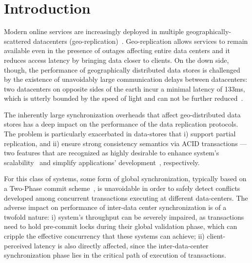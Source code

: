 \section{Introduction}
\label{sec:introduction}


Modern online services are increasingly deployed in multiple geographically-scattered datacenters (geo-replication)~\cite{spanner, kraska2013mdcc, li2012making}. Geo-replication allows services to remain available even in the presence of outages affecting entire data centers  and it reduces access latency by bringing data closer to clients. On the down side, though, the performance of geographically distributed data stores is challenged by the existence of unavoidably large communication delays between datacenters: two datacenters on opposite sides of the earth incur a minimal latency of 133ms, which is utterly bounded by the speed of light and can not be further reduced~\cite{bailis2013highly}. 

The inherently large synchronization overheads that affect geo-distributed data stores has a deep impact on the performance of the data replication protocols. The problem is particularly exacerbated in  data-stores that i) support partial replication, and ii) ensure strong consistency semantics via ACID transactions --- two features that are recognized as highly desirable to enhance system's scalability~\cite{bettina-partial} and simplify applications' development~\cite{shute2013f1}, respectively. 

For this class of systems, some form of global synchronization, typically based on a Two-Phase commit scheme~\cite{bernstein1987concurrency}, is unavoidable in order to safely detect conflicts developed among  concurrent transactions executing at different data-centers. The adverse impact on performance of inter-data center synchronization is of a twofold nature: i) system's throughput can be severely impaired, as  transactions need to hold pre-commit locks during their global validation phase, which can cripple the effective concurrency that these systems can achieve; ii) client-perceived latency is also directly affected, since the inter-data-center  synchronization phase lies in the critical path of execution of transactions.



